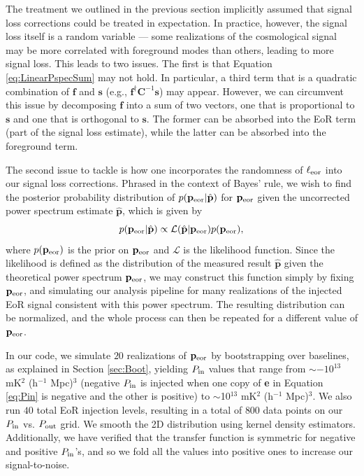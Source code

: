 \documentclass[preprint2,numberedappendix,tighten]{aastex6}  %
\newcommand{\f}{\mathbf{f}}
\newcommand{\s}{\mathbf{s}}
\newcommand{\p}{\mathbf{p}}
\newcommand{\phat}{\hat{\mathbf{p}}}
\newcommand{\C}{\mathbf{C}}
\newcommand{\dcj}[1]{{\color{orange} \textbf{[DCJ: #1]}}}
\begin{document}
The treatment we outlined in the previous section implicitly assumed that signal loss corrections could be treated in expectation. In practice, however, the signal loss itself is a random variable --- some realizations of the cosmological signal may be more correlated with foreground modes than others, leading to more signal loss. This leads to two issues. The first is that Equation \eqref{eq:LinearPspecSum} may not hold. In particular, a third term that is a quadratic combination of $\f$ and $\s$ (e.g., $\f^\dagger \C^{-1} \s$) may appear. However, we can circumvent this issue by decomposing $\f$ into a sum of two vectors, one that is proportional to $\s$ and one that is orthogonal to $\s$. The former can be absorbed into the EoR term (part of the signal loss estimate), while the latter can be absorbed into the foreground term. 

The second issue to tackle is how one incorporates the randomness of $\ell_{\rm eor}$ into our signal loss corrections. Phrased in the context of Bayes' rule, we wish to find the posterior probability distribution of $p( \p_{\rm eor} | \phat)$ for $\p_{\rm eor}$ given the uncorrected power spectrum estimate $\phat$, which is given by
\begin{equation}
\label{eq:Bayes}
p( \p_{\rm eor} | \phat) \propto \mathcal{L} (  \phat | \p_{\rm eor})  p( \p_{\rm eor}),
\end{equation}
where $p( \p_{\rm eor})$ is the prior on $\p_{\rm eor}$ and $\mathcal{L} $ is the likelihood function. Since the likelihood is defined as the distribution of the measured result $ \phat$ given the theoretical power spectrum $\p_{\rm eor}$, we may construct this function simply by fixing $\p_{\rm eor}$, and simulating our analysis pipeline for many realizations of the injected EoR signal consistent with this power spectrum. The resulting distribution can be normalized, and the whole process can then be repeated for a different value of $\p_{\rm eor}$. 

In our code, we simulate $20$ realizations of $\p_{\rm eor}$ by bootstrapping over baselines, as explained in Section \ref{sec:Boot}, yielding $P_{\rm in}$ values that range from $\sim$$-10^{13}$ mK$^{2}$ (h$^{-1}$ Mpc)$^{3}$ (negative $P_{\rm in}$ is injected when one copy of \textbf{e} in Equation \eqref{eq:Pin} is negative and the other is positive) to $\sim$10$^{13}$ mK$^{2}$ (h$^{-1}$ Mpc)$^{3}$. We also run $40$ total EoR injection levels, resulting in a total of $800$ data points on our $P_{\rm in}$ vs. $P_{\rm out}$ grid. We smooth the 2D distribution using kernel density estimators. Additionally, we have verified that the transfer function is symmetric for negative and positive $P_{\rm in}$'s, and so we fold all the values into positive ones to increase our signal-to-noise.
\end{document}
